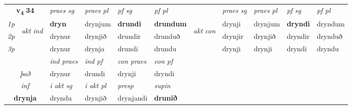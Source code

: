 \noindent
\begin{tabular}{lllllllllll} \toprule
\multicolumn{2}{c}{\textbf{v{\textsubscript{4}}} \Large{\textbf{34}}}  &  \textit{praes sg}  & \textit{praes pl}  &\textit{ pf sg} & \textit{pf pl} &  &  \textit{praes sg}  & \textit{praes pl}  & \textit{pf sg} & \textit{pf pl } \\*
	\cmidrule{3-6} \cmidrule{8-11}
 {\textit{1p}} & \multirow{3}{*}{\begin{turn}{90}\textit{akt ind}\end{turn}} & \textbf{dryn} & drynjum & \textbf{drundi} & \textbf{drundum} & \multirow{3}{*}{\begin{turn}{90}\textit{akt con}\end{turn}} &drynji & drynjum & \textbf{dryndi} & dryndum\\*
 {\textit{2p}} &  &  drynur  & drynjið & drundir & drunduð & & drynjir & drynjið & dryndir & drynduð \\*
{\textit{3p}} &  & drynur & drynja & drundi & drundu & & drynji & drynji& dryndi & dryndu \\*
\cmidrule{3-6} \cmidrule{8-11}

   & &  \textit{ind praes} & \textit{ind pf} & \textit{con praes} & \textit{con pf} \\*
\multicolumn{2}{c}{ \textit{það} } & drynur & drundi & drynji & dryndi \\*

\cmidrule{3-6}
   \multicolumn{2}{c}{\textit{inf}}  & \textit{i akt sg} & \textit{i akt pl}   & \textit{presp} & \textit{supin}   \\*
  \multicolumn{2}{c}{\textbf{drynja}} & dryndu  & drynjið   & drynjandi &  \textbf{drunið}   \\*
\end{tabular}

